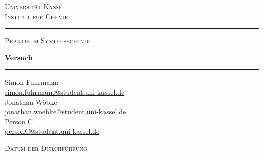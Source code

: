 \begin{titlepage}
    \begin{center}

        \vspace*{1.5cm}
        {\color{gray}\footnotesize \textsc{Universität Kassel}\\[2pt]
        \textsc{Institut für Chemie}\par}
        \vspace{0.8cm}

        {\color{gray}\rule{0.6\textwidth}{0.4pt}}

        \vspace{1.2cm}
        {\Large\scshape Praktikum Synthesechemie\par}
        \vspace{0.9cm}

        {\color{darkgray}\huge\bfseries Versuch \Versuchsnummer\par}
        \vspace{0.35cm}
        {\color{darkgray}\LARGE \Versuchstitel\par}

        \vspace{1.2cm}
        {\color{gray}\rule{0.6\textwidth}{0.4pt}}

        \vspace{1.4cm}
        {\large
        Simon Fuhrmann\\[2pt]
        \href{mailto:simon.fuhrmann@student.uni-kassel.de}{\small simon.fuhrmann@student.uni-kassel.de}\\[10pt]
        Jonathan Wöbke\\[2pt]
        \href{mailto:jonathan.woebke@student.uni-kassel.de}{\small jonathan.woebke@student.uni-kassel.de}\\[10pt]
        Person C\\[2pt]
        \href{mailto:personC@student.uni-kassel.de}{\small personC@student.uni-kassel.de}\par}

        \vfill
        {\color{gray}\footnotesize \textsc{Datum der Durchführung}\par}
        \vspace{4pt}
        {\large \Durchfuehrungsdatum\par}
        \vspace{1.2cm}

    \end{center}
\end{titlepage}
